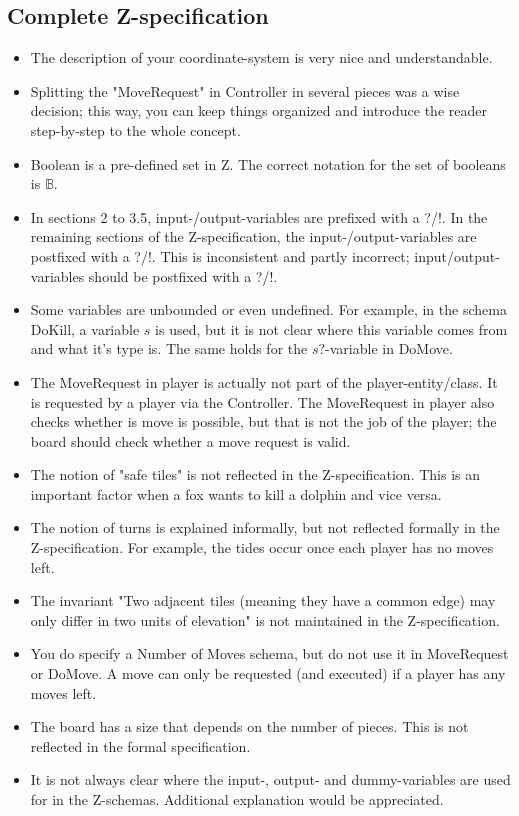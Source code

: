 \documentclass[a4paper,11pt]{article}
\begin{document}
    \subsection{Complete Z-specification}
    \begin{itemize}
        \item The description of your coordinate-system is very nice and understandable.
        \item Splitting the "MoveRequest" in Controller in several pieces was a wise decision; this way, you can keep things organized and introduce the reader step-by-step to the whole concept.
        \item Boolean is a pre-defined set in Z. The correct notation for the set of booleans is $\mathds{B}$.
        \item In sections 2 to  3.5, input-/output-variables are prefixed with a ?/!. In the remaining sections of the Z-specification, the input-/output-variables are postfixed with a ?/!. This is inconsistent and partly incorrect; input/output-variables should be postfixed with a ?/!.
        \item Some variables are unbounded or even undefined. For example, in the schema DoKill, a variable $s$ is used, but it is not clear where this variable comes from and what it's type is. The same holds for the $s?$-variable in DoMove.
        \item The MoveRequest in player is actually not part of the player-entity/class. It is requested by a player via the Controller. The MoveRequest in player also checks whether is move is possible, but that is not the job of the player; the board should check whether a move request is valid.
        \item The notion of "safe tiles" is not reflected in the Z-specification. This is an important factor when a fox wants to kill a dolphin and vice versa.
        \item The notion of turns is explained informally, but not reflected formally in the Z-specification. For example, the tides occur once each player has no moves left.
        \item The invariant "Two adjacent tiles (meaning they have a common edge) may only differ in two units of elevation" is not maintained in the Z-specification.
        \item You do specify a Number of Moves schema, but do not use it in MoveRequest or DoMove. A move can only be requested (and executed) if a player has any moves left.
        \item The board has a size that depends on the number of pieces. This is not reflected in the formal specification.
        \item It is not always clear where the input-, output- and dummy-variables are used for in the Z-schemas. Additional explanation would be appreciated.
    \end{itemize}
\end{document}
